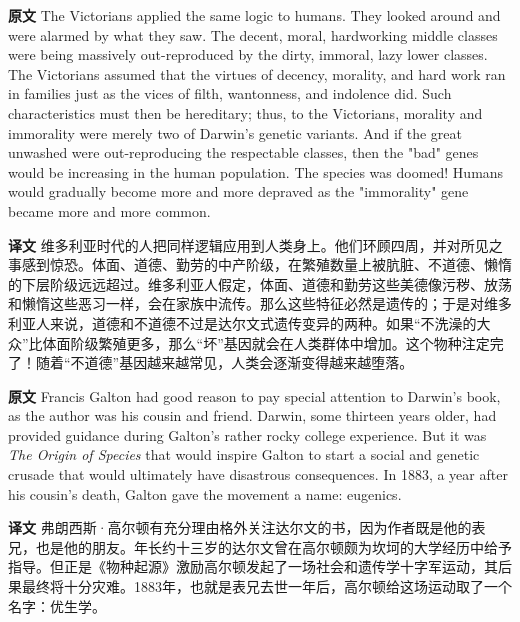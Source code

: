 \documentclass[UTF8,zihao=-4]{ctexart}
\newcommand{\BodyFont}{\fontsize{10.5pt}{15.5pt}\selectfont}
\renewenvironment{quote}{\par\noindent\begingroup\BodyFont}{\par\endgroup}
\begin{document}
\begin{quote}
\noindent\textbf{原文} The Victorians applied the same logic to humans. They looked around and were alarmed by what they saw. The decent, moral, hardworking middle classes were being massively out-reproduced by the dirty, immoral, lazy lower classes. The Victorians assumed that the virtues of decency, morality, and hard work ran in families just as the vices of filth, wantonness, and indolence did. Such characteristics must then be hereditary; thus, to the Victorians, morality and immorality were merely two of Darwin's genetic variants. And if the great unwashed were out-reproducing the respectable classes, then the "bad" genes would be increasing in the human population. The species was doomed! Humans would gradually become more and more depraved as the "immorality" gene became more and more common.

\smallskip
\noindent\textbf{译文} 维多利亚时代的人把同样逻辑应用到人类身上。他们环顾四周，并对所见之事感到惊恐。体面、道德、勤劳的中产阶级，在繁殖数量上被肮脏、不道德、懒惰的下层阶级远远超过。维多利亚人假定，体面、道德和勤劳这些美德像污秽、放荡和懒惰这些恶习一样，会在家族中流传。那么这些特征必然是遗传的；于是对维多利亚人来说，道德和不道德不过是达尔文式遗传变异的两种。如果“不洗澡的大众”比体面阶级繁殖更多，那么“坏”基因就会在人类群体中增加。这个物种注定完了！随着“不道德”基因越来越常见，人类会逐渐变得越来越堕落。
\end{quote}

\begin{quote}
\noindent\textbf{原文} Francis Galton had good reason to pay special attention to Darwin's book, as the author was his cousin and friend. Darwin, some thirteen years older, had provided guidance during Galton's rather rocky college experience. But it was \emph{The Origin of Species} that would inspire Galton to start a social and genetic crusade that would ultimately have disastrous consequences. In 1883, a year after his cousin's death, Galton gave the movement a name: eugenics.

\smallskip
\noindent\textbf{译文} 弗朗西斯·高尔顿有充分理由格外关注达尔文的书，因为作者既是他的表兄，也是他的朋友。年长约十三岁的达尔文曾在高尔顿颇为坎坷的大学经历中给予指导。但正是《物种起源》激励高尔顿发起了一场社会和遗传学十字军运动，其后果最终将十分灾难。1883年，也就是表兄去世一年后，高尔顿给这场运动取了一个名字：优生学。
\end{quote}
\end{document}
